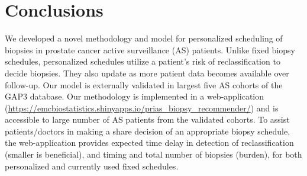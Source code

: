 \section{Conclusions}
We developed a novel methodology and model for personalized scheduling of biopsies in prostate cancer active surveillance (AS) patients. Unlike fixed biopsy schedules, personalized schedules utilize a patient's risk of reclassification to decide biopsies. They also update as more patient data becomes available over follow-up. Our model is externally validated in largest five AS cohorts of the GAP3 database. Our methodology is implemented in a web-application (\url{https://emcbiostatistics.shinyapps.io/prias_biopsy_recommender/}) and is accessible to large number of AS patients from the validated cohorts. To assist patients/doctors in making a share decision of an appropriate biopsy schedule, the web-application provides expected time delay in detection of reclassification (smaller is beneficial), and timing and total number of biopsies (burden), for both personalized and currently used fixed schedules.